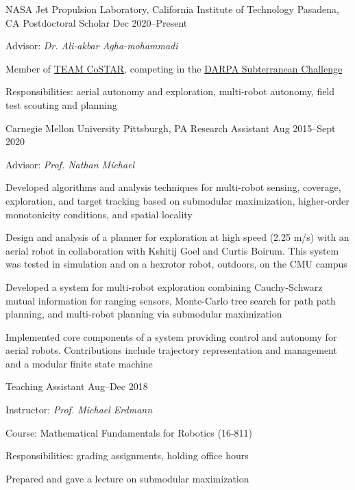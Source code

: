 
\begin{cventries}
  \cventry
  {NASA Jet Propulsion Laboratory, California Institute of Technology}
  {Pasadena, CA}
  {Postdoctoral Scholar}
  {Dec 2020--Present}
  {
    \begin{cvitems}
    \item Advisor: \emph{Dr. Ali-akbar Agha-mohammadi}
    \item Member of \href{https://costar.jpl.nasa.gov/}{TEAM CoSTAR}, competing in the
      \href{https://www.subtchallenge.com/}{DARPA Subterranean Challenge}
    \item Responsibilities:
      aerial autonomy and exploration,
      multi-robot autonomy, field test scouting and planning
    \end{cvitems}
  }
  \cventrytwo
  {Carnegie Mellon University}
  {Pittsburgh, PA}
  {Research Assistant}
  {Aug 2015--Sept 2020}
  {
    \begin{cvitems} %
    \item Advisor: \emph{Prof. Nathan Michael}
    \item Developed algorithms and analysis techniques for multi-robot sensing,
      coverage, exploration, and target tracking based on submodular
      maximization, higher-order monotonicity conditions, and spatial locality
    \item Design and analysis of a planner for exploration at high speed (2.25
      m/s) with an aerial robot in collaboration with Kshitij Goel and Curtis
      Boirum.
      This system was tested in simulation and on a hexrotor robot, outdoors, on
      the CMU campus
    \item Developed a system for multi-robot exploration combining Cauchy-Schwarz
      mutual information for ranging sensors, Monte-Carlo tree search for path
      path planning, and multi-robot planning via submodular maximization
    \item Implemented core components of a system providing control and autonomy
      for aerial robots.
      Contributions include trajectory representation and management and a
      modular finite state machine
    \end{cvitems}
  }
  {Teaching Assistant}
  {Aug--Dec 2018}
  {
    \begin{cvitems} %
    \item Instructor: \emph{Prof. Michael Erdmann}
    \item Course: Mathematical Fundamentals for Robotics (16-811)
    \item Responsibilities: grading assignments, holding office hours
    \item Prepared and gave a lecture on submodular maximization
    \end{cvitems}
  }


\end{cventries}
